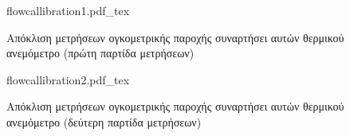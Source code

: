\begin{refsection}
\begin{figure}[!htbp]
\centering
{flowcallibration1.pdf_tex}
\caption{Απόκλιση μετρήσεων ογκομετρικής παροχής συναρτήσει αυτών θερμικού ανεμόμετρο (πρώτη παρτίδα μετρήσεων)}
\label{plt:flocall1}
\end{figure}

\begin{figure}[H]
\centering
{flowcallibration2.pdf_tex}
\caption{Απόκλιση μετρήσεων ογκομετρικής παροχής συναρτήσει αυτών θερμικού ανεμόμετρο (δεύτερη παρτίδα μετρήσεων)}
\label{plt:flocall2}
\end{figure}

\printbibheading
\begin{english}
\printbibliography[heading=subbibliography, type = book, title = {Βιβλία}]
\printbibliography[heading=subbibliography, type = inbook, title = {Κεφάλαια βιβλίων}]
\printbibliography[heading = subbibliography, type = article, title = {Δημοσιεύσεις}]
\end{english}

\end{refsection}